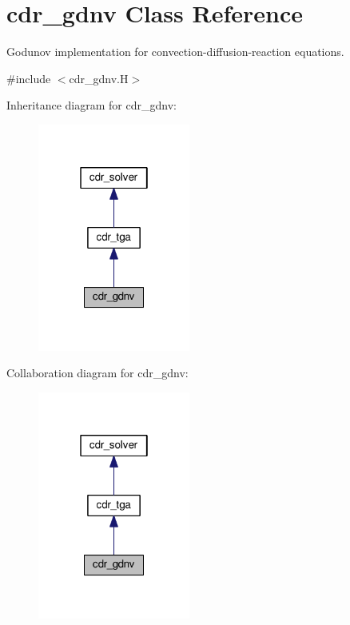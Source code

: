 \hypertarget{classcdr__gdnv}{}\section{cdr\+\_\+gdnv Class Reference}
\label{classcdr__gdnv}


Godunov implementation for convection-\/diffusion-\/reaction equations.  




{\ttfamily \#include $<$cdr\+\_\+gdnv.\+H$>$}



Inheritance diagram for cdr\+\_\+gdnv\+:\nopagebreak
\begin{figure}[H]
\begin{center}
\leavevmode
\includegraphics[width=142pt]{classcdr__gdnv__inherit__graph}
\end{center}
\end{figure}


Collaboration diagram for cdr\+\_\+gdnv\+:\nopagebreak
\begin{figure}[H]
\begin{center}
\leavevmode
\includegraphics[width=142pt]{classcdr__gdnv__coll__graph}
\end{center}
\end{figure}
